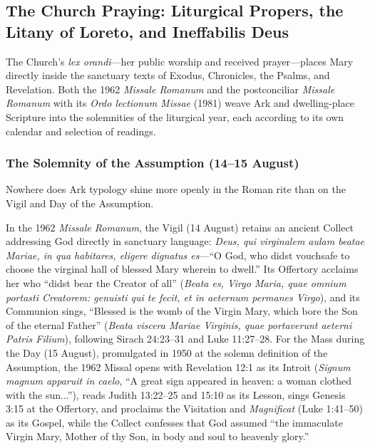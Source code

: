 \subsection{The Church Praying: Liturgical Propers, the Litany of Loreto, and Ineffabilis Deus}

The Church's \textit{lex orandi}---her public worship and received prayer---places Mary directly inside the sanctuary texts of Exodus, Chronicles, the Psalms, and Revelation. Both the 1962 \textit{Missale Romanum} and the postconciliar \textit{Missale Romanum} with its \textit{Ordo lectionum Missae} (1981) weave Ark and dwelling-place Scripture into the solemnities of the liturgical year, each according to its own calendar and selection of readings.

\subsubsection{The Solemnity of the Assumption (14--15 August)}

Nowhere does Ark typology shine more openly in the Roman rite than on the Vigil and Day of the Assumption.

In the 1962 \textit{Missale Romanum}, the Vigil (14 August) retains an ancient Collect addressing God directly in sanctuary language: \textit{Deus, qui virginalem aulam beatae Mariae, in qua habitares, eligere dignatus es}---``O God, who didst vouchsafe to choose the virginal hall of blessed Mary wherein to dwell.'' Its Offertory acclaims her who ``didst bear the Creator of all'' (\textit{Beata es, Virgo Maria, quae omnium portasti Creatorem: genuisti qui te fecit, et in aeternum permanes Virgo}), and its Communion sings, ``Blessed is the womb of the Virgin Mary, which bore the Son of the eternal Father'' (\textit{Beata viscera Mariae Virginis, quae portaverunt aeterni Patris Filium}), following Sirach 24:23--31 and Luke 11:27--28. For the Mass during the Day (15 August), promulgated in 1950 at the solemn definition of the Assumption, the 1962 Missal opens with Revelation 12:1 as its Introit (\textit{Signum magnum apparuit in caelo}, ``A great sign appeared in heaven: a woman clothed with the sun...''), reads Judith 13:22--25 and 15:10 as its Lesson, sings Genesis 3:15 at the Offertory, and proclaims the Visitation and \textit{Magnificat} (Luke 1:41--50) as its Gospel, while the Collect confesses that God assumed ``the immaculate Virgin Mary, Mother of thy Son, in body and soul to heavenly glory.''

